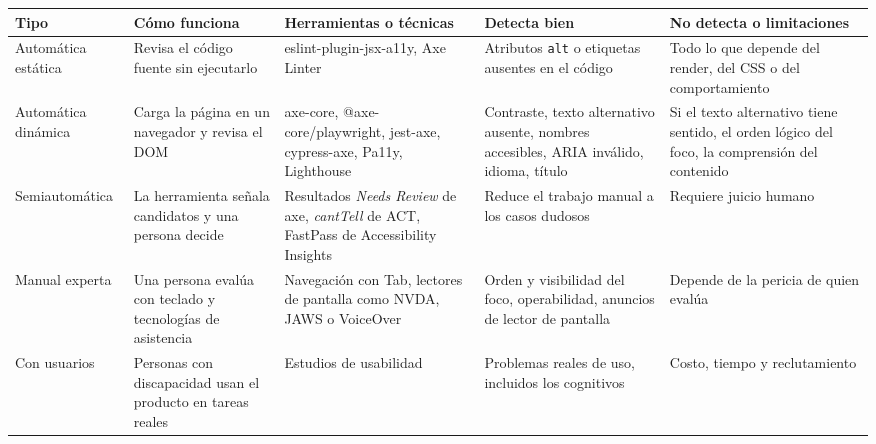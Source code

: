 \documentclass[10pt,letterpaper,onecolumn]{IEEEtran}
\newcommand{\filafina}{\arrayrulecolor{black!30}\specialrule{0.3pt}{1.5pt}{1.5pt}\arrayrulecolor{black}}
\begin{document}
\begin{longtable}[]{@{}
  >{\raggedright\arraybackslash}p{0.2027\dimexpr\linewidth-8\tabcolsep\relax}
  >{\raggedright\arraybackslash}p{0.1892\dimexpr\linewidth-8\tabcolsep\relax}
  >{\raggedright\arraybackslash}p{0.2027\dimexpr\linewidth-8\tabcolsep\relax}
  >{\raggedright\arraybackslash}p{0.2027\dimexpr\linewidth-8\tabcolsep\relax}
  >{\raggedright\arraybackslash}p{0.2027\dimexpr\linewidth-8\tabcolsep\relax}@{}}
\toprule\noalign{}
\begin{minipage}[b]{\linewidth}\raggedright
Tipo
\end{minipage} & \begin{minipage}[b]{\linewidth}\raggedright
Cómo funciona
\end{minipage} & \begin{minipage}[b]{\linewidth}\raggedright
Herramientas o técnicas
\end{minipage} & \begin{minipage}[b]{\linewidth}\raggedright
Detecta bien
\end{minipage} & \begin{minipage}[b]{\linewidth}\raggedright
No detecta o limitaciones
\end{minipage} \\
\midrule\noalign{}
\endhead
\bottomrule\noalign{}
\endlastfoot
Automática estática & Revisa el código fuente sin ejecutarlo & eslint-plugin-jsx-a11y, Axe Linter & Atributos \texttt{alt} o etiquetas ausentes en el código & Todo lo que depende del render, del CSS o del comportamiento \\ \filafina
Automática dinámica & Carga la página en un navegador y revisa el DOM & axe-core, @axe-core/playwright, jest-axe, cypress-axe, Pa11y, Lighthouse & Contraste, texto alternativo ausente, nombres accesibles, ARIA inválido, idioma, título & Si el texto alternativo tiene sentido, el orden lógico del foco, la comprensión del contenido \\ \filafina
Semiautomática & La herramienta señala candidatos y una persona decide & Resultados \emph{Needs Review} de axe, \emph{cantTell} de ACT, FastPass de Accessibility Insights & Reduce el trabajo manual a los casos dudosos & Requiere juicio humano \\ \filafina
Manual experta & Una persona evalúa con teclado y tecnologías de asistencia & Navegación con Tab, lectores de pantalla como NVDA, JAWS o VoiceOver & Orden y visibilidad del foco, operabilidad, anuncios de lector de pantalla & Depende de la pericia de quien evalúa \\ \filafina
Con usuarios & Personas con discapacidad usan el producto en tareas reales & Estudios de usabilidad & Problemas reales de uso, incluidos los cognitivos & Costo, tiempo y reclutamiento \\
\end{longtable}
\end{document}
